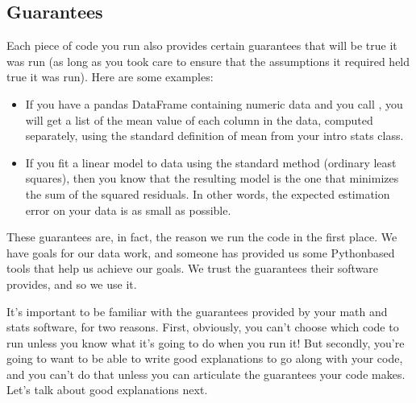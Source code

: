 \documentclass[letterpaper,10pt,english]{jupyterBook}
\begin{document}
\subsection{Guarantees}
\label{\detokenize{chapter-5-before-and-after:guarantees}}
\sphinxAtStartPar
Each piece of code you run also provides certain guarantees that will be true  it was run (as long as you took care to ensure that the assumptions it required held true  it was run).  Here are some examples:
\begin{itemize}
\item {} 
\sphinxAtStartPar
If you have a pandas DataFrame  containing numeric data and you call , you will get a list of the mean value of each column in the data, computed separately, using the standard definition of mean from your intro stats class.

\item {} 
\sphinxAtStartPar
If you fit a linear model to data using the standard method (ordinary least squares), then you know that the resulting model is the one that minimizes the sum of the squared residuals.  In other words, the expected estimation error on your data is as small as possible.

\end{itemize}

\sphinxAtStartPar
These guarantees are, in fact, the reason we run the code in the first place.  We have goals for our data work, and someone has provided us some Python\sphinxhyphen{}based tools that help us achieve our goals.  We trust the guarantees their software provides, and so we use it.

\sphinxAtStartPar
It’s important to be familiar with the guarantees provided by your math and stats software, for two reasons.  First, obviously, you can’t choose which code to run unless you know what it’s going to do when you run it!  But secondly, you’re going to want to be able to write good explanations to go along with your code, and you can’t do that unless you can articulate the guarantees your code makes.  Let’s talk about good explanations next.
\end{document}
